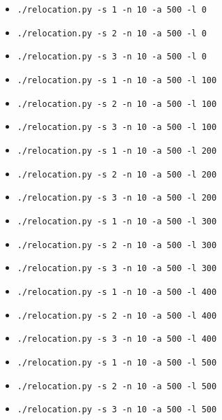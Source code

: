 \documentclass[12pt]{article}
\begin{document}
\begin{enumerate}[1.]
    \begin{itemize}
        \item \texttt{./relocation.py -s 1 -n 10 -a 500 -l 0}
        \item \texttt{./relocation.py -s 2 -n 10 -a 500 -l 0}
        \item \texttt{./relocation.py -s 3 -n 10 -a 500 -l 0}
        \item \texttt{./relocation.py -s 1 -n 10 -a 500 -l 100}
        \item \texttt{./relocation.py -s 2 -n 10 -a 500 -l 100}
        \item \texttt{./relocation.py -s 3 -n 10 -a 500 -l 100}
        \item \texttt{./relocation.py -s 1 -n 10 -a 500 -l 200}
        \item \texttt{./relocation.py -s 2 -n 10 -a 500 -l 200}
        \item \texttt{./relocation.py -s 3 -n 10 -a 500 -l 200}
        \item \texttt{./relocation.py -s 1 -n 10 -a 500 -l 300}
        \item \texttt{./relocation.py -s 2 -n 10 -a 500 -l 300}
        \item \texttt{./relocation.py -s 3 -n 10 -a 500 -l 300}
        \item \texttt{./relocation.py -s 1 -n 10 -a 500 -l 400}
        \item \texttt{./relocation.py -s 2 -n 10 -a 500 -l 400}
        \item \texttt{./relocation.py -s 3 -n 10 -a 500 -l 400}
        \item \texttt{./relocation.py -s 1 -n 10 -a 500 -l 500}
        \item \texttt{./relocation.py -s 2 -n 10 -a 500 -l 500}
        \item \texttt{./relocation.py -s 3 -n 10 -a 500 -l 500}
    \end{itemize}


\end{enumerate}
\end{document}
